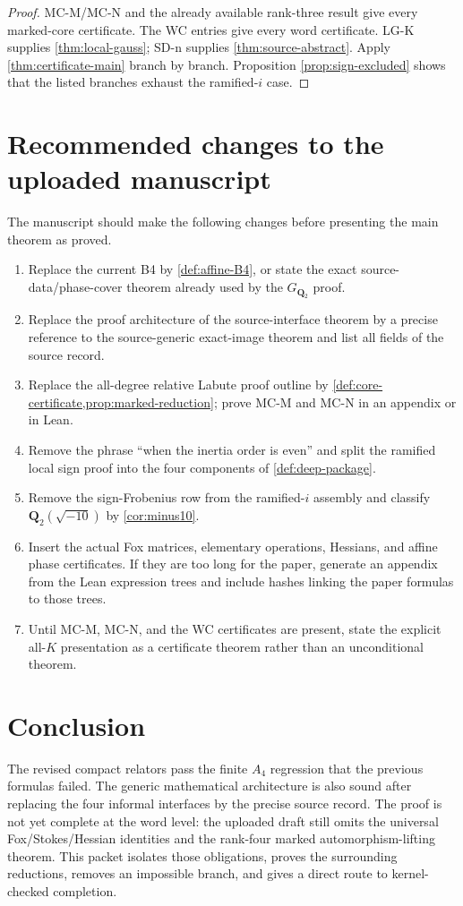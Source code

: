 \documentclass[11pt,reqno]{amsart}
\theoremstyle{remark}
\numberwithin{equation}{section}
\newcommand{\Q}{\mathbf Q}
\begin{document}
\begin{proof}
MC-M/MC-N and the already available rank-three result give every
marked-core certificate.  The WC entries give every word certificate.
LG-K supplies \cref{thm:local-gauss}; SD-n supplies
\cref{thm:source-abstract}.  Apply \cref{thm:certificate-main} branch by
branch.  Proposition \ref{prop:sign-excluded} shows that the listed
branches exhaust the ramified-\(i\) case.
\end{proof}

\section{Recommended changes to the uploaded manuscript}

The manuscript should make the following changes before presenting the
main theorem as proved.

\begin{enumerate}
\item Replace the current B4 by \cref{def:affine-B4}, or state the exact
source-data/phase-cover theorem already used by the \(G_{\Q_2}\) proof.
\item Replace the proof architecture of the source-interface theorem by a
precise reference to the source-generic exact-image theorem and list all
fields of the source record.
\item Replace the all-degree relative Labute proof outline by
\cref{def:core-certificate,prop:marked-reduction}; prove MC-M and MC-N in
an appendix or in Lean.
\item Remove the phrase ``when the inertia order is even'' and split the
ramified local sign proof into the four components of
\cref{def:deep-package}.
\item Remove the sign-Frobenius row from the ramified-\(i\) assembly and
classify \(\Q_2(\sqrt{-10})\) by \cref{cor:minus10}.
\item Insert the actual Fox matrices, elementary operations, Hessians, and
affine phase certificates.  If they are too long for the paper, generate
an appendix from the Lean expression trees and include hashes linking the
paper formulas to those trees.
\item Until MC-M, MC-N, and the WC certificates are present, state the
explicit all-\(K\) presentation as a certificate theorem rather than an
unconditional theorem.
\end{enumerate}

\section*{Conclusion}

The revised compact relators pass the finite \(A_4\) regression that the
previous formulas failed.  The generic mathematical architecture is also
sound after replacing the four informal interfaces by the precise source
record.  The proof is not yet complete at the word level: the uploaded
draft still omits the universal Fox/Stokes/Hessian identities and the
rank-four marked automorphism-lifting theorem.  This packet isolates those
obligations, proves the surrounding reductions, removes an impossible
branch, and gives a direct route to kernel-checked completion.
\end{document}
